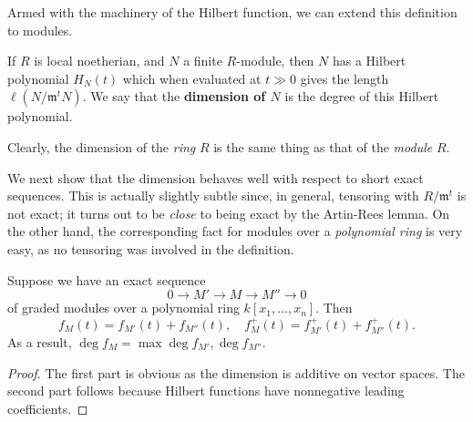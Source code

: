 Armed with the machinery of the Hilbert function, we can extend this
definition to modules.
\begin{definition} 
If $R$ is local noetherian, and $N$ a finite $R$-module, then $N$ has a
Hilbert polynomial $H_N(t)$ which when evaluated at $t \gg 0$ gives
the length $\ell(N/\mathfrak{m}^t N)$.
We say that the \textbf{dimension of
$N$} is the degree of this Hilbert polynomial.
\end{definition} 

Clearly, the dimension of the \emph{ring} $R$ is the same thing as that of the
\emph{module} $R$.

We next show that the dimension behaves well with respect to short exact
sequences. This is actually slightly subtle since, in general, tensoring with
$R/\mathfrak{m}^t$ is not exact; it turns out to be \emph{close} to being
exact by the Artin-Rees lemma. 
On the other hand, the corresponding fact for modules over a \emph{polynomial
ring} is very easy, as 
no tensoring was involved in the definition.

\begin{proposition} 
Suppose we have an exact sequence
\[ 0 \to M' \to M \to M'' \to 0 \]
of graded modules over a polynomial ring $k[x_1, \dots, x_n]$.	Then
\[ f_M(t) = f_{M'}(t) + f_{M''}(t), \quad  f_M^+(t) = f_{M'}^+(t) +
f_{M''}^+(t). \]
As a result, $\deg f_M = \max \deg f_{M'}, \deg f_{M''}$.
\end{proposition} 
\begin{proof} The first part is obvious as the dimension is additive on vector
spaces. The second part follows because Hilbert functions have nonnegative
leading coefficients.
\end{proof} 

